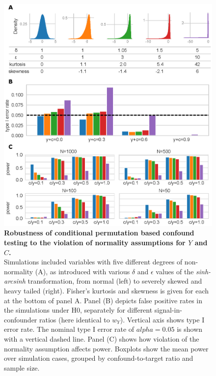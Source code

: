 \documentclass{article}
\begin{document}
\begin{figure}[!b]
  \centering
  \includegraphics[width=0.40\paperwidth]{fig/sim_non-norm.eps}
  \caption{\textbf{Robustness of conditional permutation based confound testing to the violation of normality assumptions for $Y$ and $C$.} \\
  Simulations included variables with five different degrees of non-normality (A), as introduced with various $\delta$ and $\epsilon$ values of the \emph{sinh-arcsinh} transformation, from normal (left) to severely skewed and heavy tailed (right). Fisher's kurtosis and skewness is given for each at the bottom of panel A. Panel (B) depicts false positive rates in the simulations under H0, separately for different signal-in-confounder ratios (here identical to $w_{Y}$).
  Vertical axis shows type I error rate. The nominal type I error rate of $alpha=0.05$ is shown with a vertical dashed line. Panel (C) shows how violation of the normality assumption affects power. Boxplots show the mean power over simulation cases, grouped by confound-to-target ratio and sample size.}
  \label{fig:sim-non-normal}
\end{figure}
\end{document}

